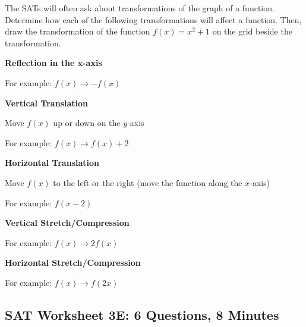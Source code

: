 The SATs will often ask about transformations of the graph of a function. Determine how each of the following transformations will affect a function. Then, draw the transformation of the function $f(x)=x^2+1$ on the grid beside the transformation.

\begin{multicols}{2}
\textbf{Reflection in the $\boldsymbol{x}$-axis}

\bigskip
For example: $f(x)\rightarrow-f(x)$

\vfill
\columnbreak
\plane
\end{multicols}

\hrulefill
\begin{multicols}{2}
\textbf{Vertical Translation}

Move $f(x)$ up or down on the $y$-axis

\bigskip
For example: $f(x)\rightarrow f(x)+2$

\vfill
\columnbreak
\plane
\end{multicols}

\hrulefill
\begin{multicols}{2}
\textbf{Horizontal Translation}

Move $f(x)$ to the left or the right (move the function along the $x$-axis)

\bigskip
For example: $f(x-2)$

\vfill
\columnbreak
\plane
\end{multicols}

\newpage
\begin{multicols}{2}
\textbf{Vertical Stretch/Compression}

\bigskip
For example: $f(x)\rightarrow2f(x)$

\vfill
\columnbreak
\plane
\end{multicols}

\hrulefill
\begin{multicols}{2}
\textbf{Horizontal Stretch/Compression}

\bigskip
For example: $f(x)\rightarrow f(2x)$

\vfill
\columnbreak
\plane
\end{multicols}

\newpage
\subsection{SAT Worksheet 3E: 6 Questions, 8 Minutes}

